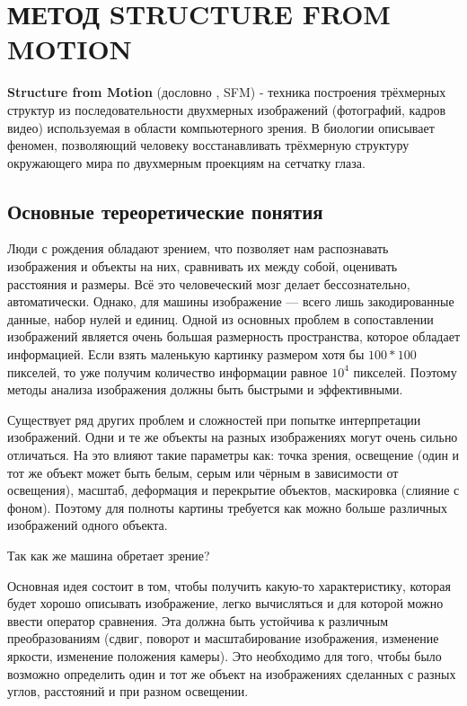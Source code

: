 \chapter{МЕТОД STRUCTURE FROM MOTION}

\textbf{Structure from Motion} (дословно , SFM) - техника построения трёхмерных структур из последовательности двухмерных изображений (фотографий, кадров видео) используемая в области компьютерного зрения. В биологии описывает феномен, позволяющий человеку восстанавливать трёхмерную структуру окружающего мира по двухмерным проекциям на сетчатку глаза.

\section{Основные тереоретические понятия}

Люди с рождения обладают зрением, что позволяет нам распознавать изображения и объекты на них, сравнивать их между собой, оценивать расстояния и размеры. Всё это человеческий мозг делает бессознательно, автоматически. Однако, для машины изображение — всего лишь закодированные данные, набор нулей и единиц. Одной из основных проблем в сопоставлении изображений является очень большая размерность пространства, которое обладает информацией. Если взять маленькую картинку размером хотя бы $100*100$ пикселей, то уже получим количество информации равное $10^4$ пикселей. Поэтому методы анализа изображения должны быть быстрыми и эффективными.

Существует ряд других проблем и сложностей при попытке интерпретации изображений. Одни и те же объекты на разных изображениях могут очень сильно отличаться. На это влияют такие параметры как: точка зрения, освещение (один и тот же объект может быть белым, серым или чёрным в зависимости от освещения), масштаб, деформация и перекрытие объектов, маскировка (слияние с фоном). Поэтому для полноты картины требуется как можно больше различных изображений одного объекта.

\vspace{1mm}
Так как же машина обретает зрение?

Основная идея состоит в том, чтобы получить какую-то характеристику, которая будет хорошо описывать изображение, легко вычисляться и для которой можно ввести оператор сравнения. Эта  должна быть устойчива к различным преобразованиям (сдвиг, поворот и масштабирование изображения, изменение яркости, изменение положения камеры). Это необходимо для того, чтобы было возможно определить один и тот же объект на изображениях сделанных с разных углов, расстояний и при разном освещении.

